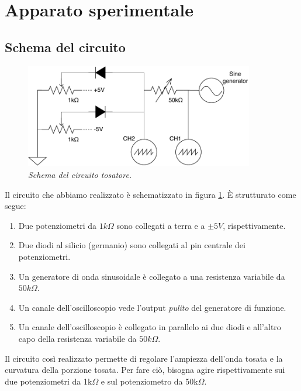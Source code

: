 \section{Apparato sperimentale}\label{sec:apparato-sperimentale}
\subsection{Schema del circuito}\label{subsec:schema-circuito}

\begin{figure}[h]
  \centering
      \includegraphics[width=10cm]{../assets/circuito.drawio.pdf}
      \caption{
        \emph{
          Schema del circuito tosatore.
        }
      }
    \label{fig:circuito}
\end{figure} %

Il circuito che abbiamo realizzato è schematizzato in figura \ref{fig:circuito}.
È strutturato come segue:
\begin{enumerate}
  \item%
  Due potenziometri da $1k\Omega$ sono collegati a terra e a $\pm 5V$, rispettivamente.
  \item%
  Due diodi al silicio (germanio) sono collegati al pin centrale dei potenziometri.
  \item%
  Un generatore di onda sinusoidale è collegato a una resistenza variabile da $50k\Omega$.
  \item%
  Un canale dell'oscilloscopio vede l'output \emph{pulito} del generatore di funzione.
  \item%
  Un canale dell'oscilloscopio è collegato in parallelo ai due diodi e all'altro capo della resistenza variabile da $50k\Omega$.
\end{enumerate}
Il circuito così realizzato permette di regolare l'ampiezza dell'onda tosata e la curvatura
della porzione tosata.
Per fare ciò, bisogna agire rispettivamente sui due potenziometri da 1k$\Omega$
e sul potenziometro da 50k$\Omega$.

